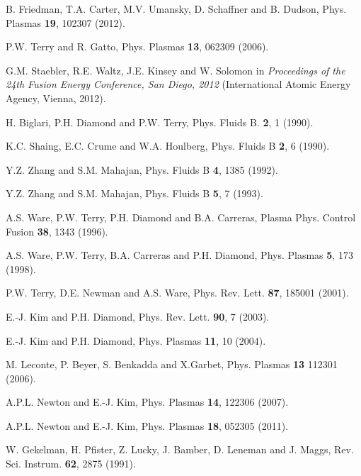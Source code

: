 \documentclass[aip,pop,amsmath,amssymb,reprint,superscriptaddress]{revtex4-1} %
\begin{document}
\begin{thebibliography}{10}
B. Friedman, T.A. Carter, M.V. Umansky, D. Schaffner and B. Dudson, Phys. Plasmas {\bf 19}, 102307 (2012).

P.W. Terry and R. Gatto, Phys. Plasmas {\bf 13}, 062309 (2006).

G.M. Staebler, R.E. Waltz, J.E. Kinsey and W. Solomon in \textit{Proceedings of the 24th Fusion Energy Conference, San Diego, 2012} (International Atomic Energy Agency, Vienna, 2012).

H. Biglari, P.H. Diamond and P.W. Terry, Phys. Fluids B. {\bf 2},  1  (1990).

K.C. Shaing, E.C. Crume and W.A. Houlberg, Phys. Fluids B {\bf 2}, 6 (1990).

Y.Z. Zhang and S.M. Mahajan, Phys. Fluids B {\bf 4}, 1385 (1992).

Y.Z. Zhang and S.M. Mahajan, Phys. Fluids B {\bf 5}, 7 (1993).

A.S. Ware, P.W. Terry, P.H. Diamond and B.A. Carreras, Plasma Phys. Control Fusion {\bf 38},  1343  (1996).

A.S. Ware, P.W. Terry, B.A. Carreras and P.H. Diamond, Phys. Plasmas {\bf 5}, 173 (1998).

P.W. Terry, D.E. Newman and A.S. Ware, Phys. Rev. Lett. {\bf 87}, 185001  (2001).

E.-J. Kim and P.H. Diamond, Phys. Rev. Lett. {\bf 90}, 7 (2003).

E.-J. Kim and P.H. Diamond, Phys. Plasmas {\bf 11},  10  (2004).

M. Leconte, P. Beyer, S. Benkadda and X.Garbet, Phys. Plasmas {\bf 13} 112301 (2006).

A.P.L. Newton and E.-J. Kim, Phys. Plasmas {\bf 14}, 122306 (2007).

A.P.L. Newton and E.-J. Kim, Phys. Plasmas {\bf 18}, 052305 (2011).

W. Gekelman, H. Pfister, Z. Lucky, J. Bamber, D. Leneman and J. Maggs, Rev. Sci. Instrum. {\bf 62},  2875  (1991).




\end{thebibliography}
\end{document}
